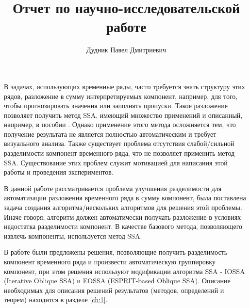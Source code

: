 \documentclass[specialist, substylefile = spbureport.rtx, subf,href,colorlinks=true, 12pt]{disser}
\theoremstyle{definition}
\begin{document}
%
%

\title{Отчет по научно-исследовательской работе}


\author{Дудник Павел Дмитриевич}
    

\date{\number\year}

\maketitle

\tableofcontents

\intro
В задачах, использующих временные ряды, часто требуется знать структуру этих рядов, разложение в сумму интерпретируемых компонент, например, для того, чтобы прогнозировать значения или заполнять пропуски. Такое разложение позволяет получить метод SSA, имеющий множество применений и описанный, например, в пособии \cite{Golyandina04}. Однако применение этого метода осложняется тем, что получение результата не является полностью автоматическим и требует визуального анализа. Также существует проблема отсутствия слабой/сильной разделимости компонент временного ряда, что не позволяет применить метод SSA. Существование этих проблем служит мотивацией для написания этой работы и проведения экспериментов.

В данной работе рассматривается проблема улучшения разделимости для автоматизации разложения временного ряда в сумму компонент, была поставлена задача создания алгоритма/нескольких алгоритмов для решения этой проблемы. Иначе говоря, алгоритм должен автоматически получать разложение в условиях недостатка разделимости компонент. В качестве базового метода, позволяющего извлечь компоненты, используется метод SSA.

В работе были предложены решения, позволяющие получить разделимость компонент временного ряда и произвести автоматическую группировку компонент, при этом решения используют модификации алгоритма SSA - IOSSA (Iterative Oblique SSA) и EOSSA (ESPRIT-based Oblique SSA). Описание необходимых для описания решений результатов (методов, определений и теорем) находится в разделе \ref{ch:1}.
\end{document}
